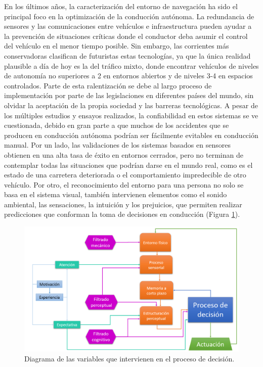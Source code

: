 En los últimos años, la caracterización del entorno de navegación ha sido el principal foco en la optimización de la conducción autónoma. La redundancia de sensores y las comunicaciones entre vehículos e infraestructura pueden ayudar a la prevención de situaciones críticas donde el conductor deba asumir el control del vehículo en el menor tiempo posible. Sin embargo, las corrientes más conservadoras clasifican de futuristas estas tecnologías, ya que la única realidad plausible a día de hoy es la del tráfico mixto, donde encontrar vehículos de niveles de autonomía no superiores a 2 en entornos abiertos y de niveles 3-4 en espacios controlados. Parte de esta ralentización se debe al largo proceso de implementación por parte de las legislaciones en diferentes países del mundo, sin olvidar la aceptación de la propia sociedad y las barreras tecnológicas. A pesar de los múltiples estudios y ensayos realizados, la confiabilidad en estos sistemas se ve cuestionada, debido en gran parte a que muchos de los accidentes que se producen en conducción autónoma podrían ser fácilmente evitables en conducción manual. Por un lado, las validaciones de los sistemas basados en sensores obtienen en una alta tasa de éxito en entornos cerrados, pero no terminan de contemplar todas las situaciones que podrían darse en el mundo real, como es el estado de una carretera deteriorada o el comportamiento impredecible de otro vehículo. Por otro, el reconocimiento del entorno para una persona no solo se basa en el sistema visual, también intervienen elementos como el sonido ambiental, las sensaciones, la intuición y los prejuicios, que permiten realizar predicciones que conforman la toma de decisiones en conducción (Figura \ref{fig:1.1}).

\newpage

\begin{figure}[ht]
  \centering
  \includegraphics[width=12.5cm]{figures/1.1.png}
  \caption{\label{fig:1.1} Diagrama de las variables que intervienen en el proceso de decisión.}
\end{figure}


